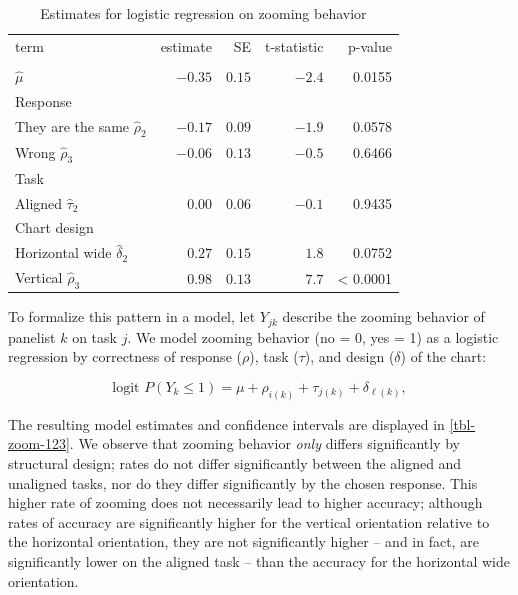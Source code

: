 \documentclass[
]{jds}
\begin{document}
\begin{longtable}{lrrrr}
\caption{\label{tbl-zoom-123}Coefficients for logistic regression of zooming by task }\tabularnewline

\caption*{
{\large Estimates for logistic regression on zooming behavior}
} \\ 
\toprule
term & estimate & SE & t-statistic & p-value \\ 
\midrule
\multicolumn{5}{l}{} \\ 
\midrule
$\widehat{\mu}$ & $-0.35$ & $0.15$ & $-2.4$ & 0.0155 \\ 
\midrule
\multicolumn{5}{l}{Response} \\ 
\midrule
They are the same $\widehat{\rho}_2$ & $-0.17$ & $0.09$ & $-1.9$ & 0.0578 \\ 
Wrong $\widehat{\rho}_3$ & $-0.06$ & $0.13$ & $-0.5$ & 0.6466 \\ 
\midrule
\multicolumn{5}{l}{Task} \\ 
\midrule
Aligned $\widehat{\tau}_2$ & $0.00$ & $0.06$ & $-0.1$ & 0.9435 \\ 
\midrule
\multicolumn{5}{l}{Chart design} \\ 
\midrule
Horizontal wide $\widehat{\delta}_2$ & $0.27$ & $0.15$ & $1.8$ & 0.0752 \\ 
Vertical $\widehat{\rho}_3$ & $0.98$ & $0.13$ & $7.7$ & < 0.0001 \\ 
\bottomrule
\end{longtable}

To formalize this pattern in a model, let \(Y_{jk}\) describe the
zooming behavior of panelist \(k\) on task \(j\). We model zooming
behavior (no = 0, yes = 1) as a logistic regression by correctness of
response (\(\rho\)), task (\(\tau\)), and design (\(\delta\)) of the
chart:

\begin{equation}
\text{logit } P(Y_k \le 1) = \mu + \rho_{i(k)} + \tau_{j(k)} + \delta_{\ell(k)},
\end{equation}

The resulting model estimates and confidence intervals are displayed in
\autoref{tbl-zoom-123}. We observe that zooming behavior \emph{only}
differs significantly by structural design; rates do not differ
significantly between the aligned and unaligned tasks, nor do they
differ significantly by the chosen response. This higher rate of zooming
does not necessarily lead to higher accuracy; although rates of accuracy
are significantly higher for the vertical orientation relative to the
horizontal orientation, they are not significantly higher -- and in
fact, are significantly lower on the aligned task -- than the accuracy
for the horizontal wide orientation.
\end{document}
